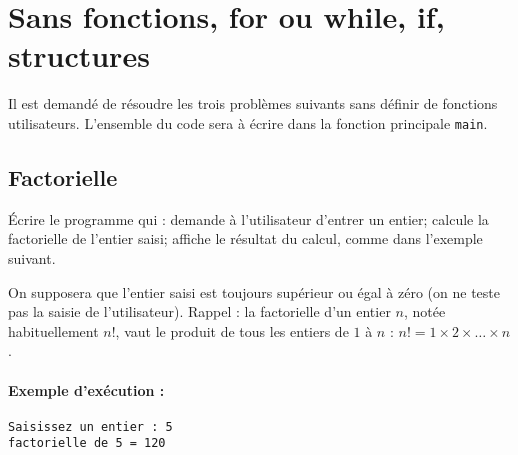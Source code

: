 \section{Sans fonctions, for ou while, if, structures}

Il est demandé de résoudre les trois problèmes suivants sans définir de
fonctions utilisateurs.  L'ensemble du code sera à écrire dans la
fonction principale \verb|main|.

\subsection{Factorielle}

\question Écrire le programme qui : demande à l'utilisateur d'entrer
un entier; calcule la factorielle de l'entier saisi; affiche le
résultat du calcul, comme dans l'exemple suivant. 

On supposera que l'entier saisi est toujours supérieur ou égal à zéro
(on ne teste pas la saisie de l'utilisateur). Rappel : la factorielle
d'un entier $n$, notée habituellement $n!$, vaut le produit de tous
les entiers de $1$ à $n$ : $n! = 1\times 2\times \ldots\times n$.

\paragraph{Exemple d'exécution :}
\begin{small}
\begin{verbatim}
Saisissez un entier : 5
factorielle de 5 = 120
\end{verbatim}
\end{small}


